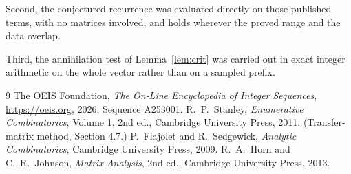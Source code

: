 \documentclass[11pt,a4paper]{article}
\theoremstyle{plain}
\theoremstyle{definition}
\begin{document}
Second, the conjectured recurrence was evaluated directly on those published terms, with no
matrices involved, and holds wherever the proved range and the data overlap.

Third, the annihilation test of Lemma~\ref{lem:crit} was carried out in exact integer
arithmetic on the whole vector rather than on a sampled prefix.

\begin{thebibliography}{9}
 The OEIS Foundation, \emph{The On-Line Encyclopedia of Integer
Sequences}, \url{https://oeis.org}, 2026. Sequence A253001.
 R.~P.~Stanley, \emph{Enumerative Combinatorics}, Volume 1, 2nd ed.,
Cambridge University Press, 2011. (Transfer-matrix method, Section 4.7.)
 P.~Flajolet and R.~Sedgewick, \emph{Analytic Combinatorics}, Cambridge
University Press, 2009.
 R.~A.~Horn and C.~R.~Johnson, \emph{Matrix Analysis}, 2nd ed., Cambridge
University Press, 2013.
\end{thebibliography}
\end{document}

